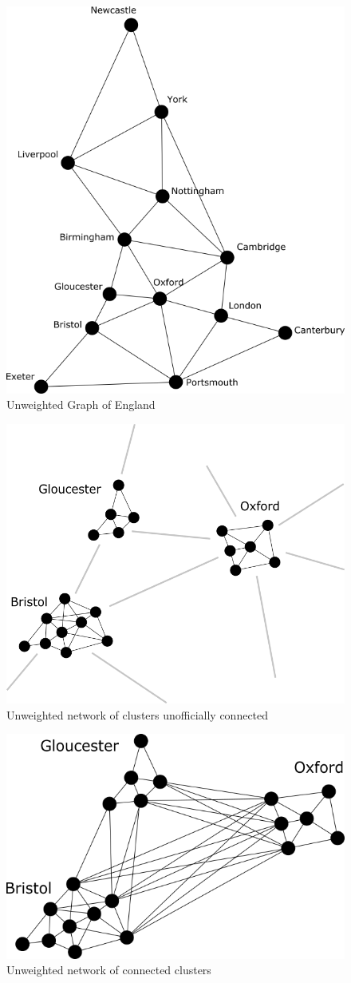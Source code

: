 \documentclass[twocolumn]{article}
\begin{document}
\begin{figure}[H]
\centering
\includegraphics[width=0.75\columnwidth]{Figures/England Clusters.png}
\caption{Unweighted Graph of England}
\end{figure}


\begin{figure}[H]
\centering
\includegraphics[width=0.80\columnwidth]{Figures/Cluster Zoomed.png}
\caption{Unweighted network of clusters unofficially connected}
\end{figure}


\begin{figure}[H]
\centering
\includegraphics[width=0.75\columnwidth]{Figures/Connected Cluster Zoomed.png}
\caption{Unweighted network of connected clusters}
\end{figure}
\end{document}
